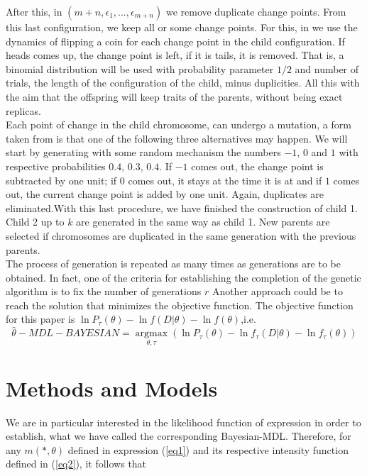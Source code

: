 \documentclass[APA,STIX1COL]{WileyNJD-v2}
\begin{document}
After this, in $(m+n,\epsilon_1, ..., \epsilon_{m+n})$ we remove duplicate change points. From this last configuration, we keep all or some change points. For this, in  \cite{Li2012} we use the dynamics of flipping a coin for each change point in the child configuration. If heads comes up, the change point is left, if it is tails, it is removed. That is, a binomial distribution will be used with probability parameter $1/2$ and number of trials, the length of the configuration of the child, minus duplicities. All this with the aim that the offspring will keep traits of the parents, without being exact replicas.\\


Each point of change in the child chromosome, can undergo a mutation, a form taken from \cite{Li2012} is that one of the following three alternatives may happen. We will start by generating with some random mechanism the numbers $-1$, $0$ and $1$ with respective probabilities $0.4$, $0.3$, $0.4$. If $-1$ comes out, the change point is subtracted by one unit; if $0$ comes out, it stays at the time it is at and if  $1$ comes out, the current change point is added by one unit. Again, duplicates are eliminated.With this last procedure, we have finished the construction of child 1. Child 2 up to $k$ are generated in the same way as child 1.  New parents are selected if chromosomes are duplicated in the same generation with the previous parents. \\


The process of generation is repeated as many times as generations are to be obtained. In fact, one of the criteria for establishing the completion of the genetic algorithm is to fix the number of generations $r$  Another approach could be to reach the solution that minimizes the objective function. The objective function for this paper is $\ln P_\tau(\theta) -  \ln f(D|\theta) - \ln f(\theta)$,i.e.
\begin{equation}
	\label{eq9}
	\hat{\theta}-MDL-BAYESIAN =\underset{\theta,\tau}{\operatorname{argmax}}  \left(\ln P_\tau(\theta) -  \ln f_\tau(D|\theta) - \ln f_\tau(\theta)\right)
\end{equation}


\section{Methods and Models}


 We are in particular interested in the likelihood function of expression in order to establish, what we have called the corresponding Bayesian-MDL. Therefore, for any $ m (*,\theta)$ defined in expression (\ref{eq1}) and its respective intensity function defined in (\ref{eq2}), it follows that
\end{document}
